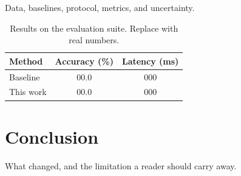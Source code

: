 \documentclass[conference]{IEEEtran}
\begin{document}
Data, baselines, protocol, metrics, and uncertainty.

\begin{table}[t]
  \centering
  \caption{Results on the evaluation suite. Replace with real numbers.}
  \label{tab:results}
  \begin{tabular}{lcc}
    \toprule
    Method & Accuracy (\%) & Latency (ms) \\
    \midrule
    Baseline & 00.0 & 000 \\
    This work & 00.0 & 000 \\
    \bottomrule
  \end{tabular}
\end{table}

\section{Conclusion}
\label{sec:conclusion}

What changed, and the limitation a reader should carry away.
\end{document}
